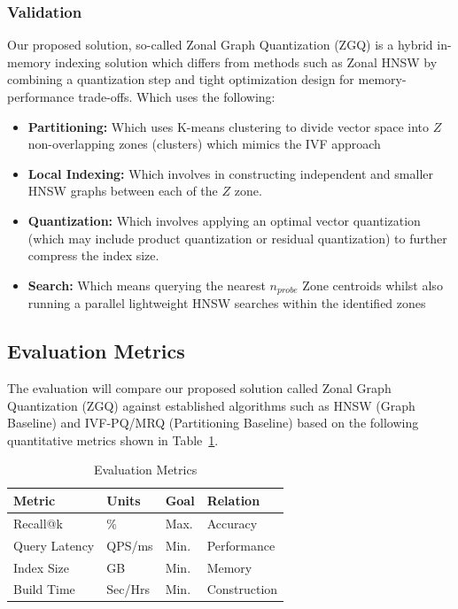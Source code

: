 \documentclass[conference]{IEEEtran}
\begin{document}
\subsubsection{Validation}
Our proposed solution, so-called Zonal Graph Quantization (ZGQ) is a hybrid in-memory indexing solution which differs from methods such as Zonal HNSW by combining a quantization step and tight optimization design for memory-performance trade-offs. Which uses the following:

\begin{itemize}
\item \textbf{Partitioning:} Which uses K-means clustering to divide vector space into $Z$ non-overlapping zones (clusters) which mimics the IVF approach
\item \textbf{Local Indexing:} Which involves in constructing independent and smaller HNSW graphs between each of the $Z$ zone.
\item \textbf{Quantization:} Which involves applying an optimal vector quantization (which may include product quantization or residual quantization) to further compress the index size.
\item \textbf{Search:} Which means querying the nearest $n_{probe}$ Zone centroids whilst also running a parallel lightweight HNSW searches within the identified zones
\end{itemize}

\subsection{Evaluation Metrics}
The evaluation will compare our proposed solution called Zonal Graph Quantization (ZGQ) against established algorithms such as HNSW (Graph Baseline) and IVF-PQ/MRQ (Partitioning Baseline) based on the following quantitative metrics shown in Table~\ref{tab:metrics}.

\begin{table}[htbp]
\caption{Evaluation Metrics}
\label{tab:metrics}
\centering
\begin{tabular}{llll}
\toprule
\textbf{Metric} & \textbf{Units} & \textbf{Goal} & \textbf{Relation} \\
\midrule
Recall@k & \% & Max. & Accuracy \\
Query Latency & QPS/ms & Min. & Performance \\
Index Size & GB & Min. & Memory \\
Build Time & Sec/Hrs & Min. & Construction \\
\bottomrule
\end{tabular}
\end{table}
\end{document}
